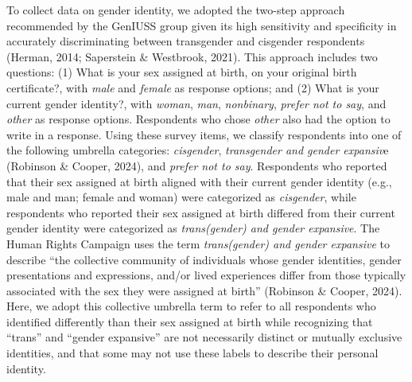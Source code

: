 \begin{table}[htbp]
\centering
\caption{Demographic Characteristics of 12th Grade Participants}
\label{tab:demographics}

\end{table}

To collect data on gender identity, we adopted the two-step approach
recommended by the GenIUSS group given its high sensitivity and
specificity in accurately discriminating between transgender and
cisgender respondents (Herman, 2014; Saperstein \& Westbrook, 2021). This
approach includes two questions: (1) What is your sex assigned at birth,
on your original birth certificate?, with \emph{male} and \emph{female} as
response options; and (2) What is your current gender identity?, with
\emph{woman}, \emph{man}, \emph{nonbinary}, \emph{prefer not to say}, and \emph{other} as
response options. Respondents who chose \emph{other} also had the option to
write in a response. Using these survey items, we classify respondents
into one of the following umbrella categories: \emph{cisgender}, \emph{transgender
and gender expansiv}e (Robinson \& Cooper, 2024), and \emph{prefer not to
say}. Respondents who reported that their sex assigned at birth aligned
with their current gender identity (e.g., male and man; female and
woman) were categorized as \emph{cisgender}, while respondents who reported
their sex assigned at birth differed from their current gender identity
were categorized as \emph{trans(gender) and gender expansive}. The Human
Rights Campaign uses the term \emph{trans(gender) and gender expansive} to
describe ``the collective community of individuals whose gender
identities, gender presentations and expressions, and/or lived
experiences differ from those typically associated with the sex they
were assigned at birth'' (Robinson \& Cooper, 2024). Here, we adopt this
collective umbrella term to refer to all respondents who identified
differently than their sex assigned at birth while recognizing that
``trans'' and ``gender expansive'' are not necessarily distinct or mutually
exclusive identities, and that some may not use these labels to describe
their personal identity.


